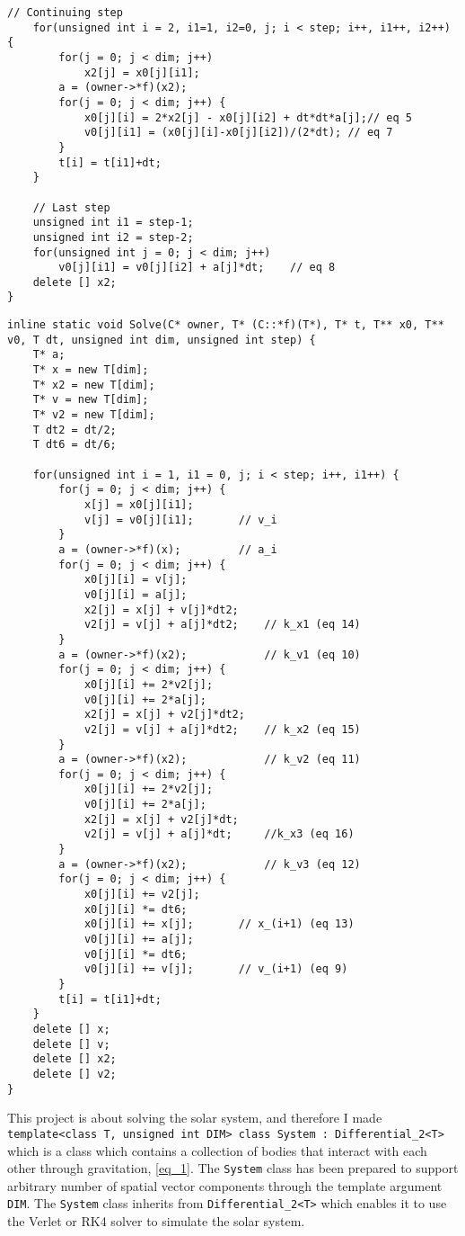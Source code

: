 \documentclass[11pt,english,a4paper]{article}
\begin{document}
\begin{flushleft}
\begin{lstlisting}[title={\texttt{Differential\_2::Diff<DifferentialType::Verlet,C>::Solve}}]
	// Continuing step
	for(unsigned int i = 2, i1=1, i2=0, j; i < step; i++, i1++, i2++) {
		for(j = 0; j < dim; j++)
			x2[j] = x0[j][i1];
		a = (owner->*f)(x2);
		for(j = 0; j < dim; j++) {
			x0[j][i] = 2*x2[j] - x0[j][i2] + dt*dt*a[j];// eq 5
			v0[j][i1] = (x0[j][i]-x0[j][i2])/(2*dt); // eq 7
		}
		t[i] = t[i1]+dt;
	}
	
	// Last step
	unsigned int i1 = step-1;
	unsigned int i2 = step-2;
	for(unsigned int j = 0; j < dim; j++)
		v0[j][i1] = v0[j][i2] + a[j]*dt;	// eq 8
	delete [] x2;
}
\end{lstlisting}

\begin{lstlisting}[title={\texttt{Differential\_2::Diff<DifferentialType::RK4,C>::Solve}}]
inline static void Solve(C* owner, T* (C::*f)(T*), T* t, T** x0, T** v0, T dt, unsigned int dim, unsigned int step) {
	T* a;
	T* x = new T[dim];
	T* x2 = new T[dim];
	T* v = new T[dim];
	T* v2 = new T[dim];
	T dt2 = dt/2;
	T dt6 = dt/6;
	
	for(unsigned int i = 1, i1 = 0, j; i < step; i++, i1++) {
		for(j = 0; j < dim; j++) {
			x[j] = x0[j][i1];
			v[j] = v0[j][i1];		// v_i
		}
		a = (owner->*f)(x);			// a_i
		for(j = 0; j < dim; j++) {
			x0[j][i] = v[j];
			v0[j][i] = a[j];
			x2[j] = x[j] + v[j]*dt2;	
			v2[j] = v[j] + a[j]*dt2;	// k_x1 (eq 14)
		}
		a = (owner->*f)(x2);			// k_v1 (eq 10)
		for(j = 0; j < dim; j++) {
			x0[j][i] += 2*v2[j];
			v0[j][i] += 2*a[j];
			x2[j] = x[j] + v2[j]*dt2;
			v2[j] = v[j] + a[j]*dt2;	// k_x2 (eq 15)
		}
		a = (owner->*f)(x2);			// k_v2 (eq 11)
		for(j = 0; j < dim; j++) {
			x0[j][i] += 2*v2[j];
			v0[j][i] += 2*a[j];
			x2[j] = x[j] + v2[j]*dt;
			v2[j] = v[j] + a[j]*dt;		//k_x3 (eq 16)
		}
		a = (owner->*f)(x2);			// k_v3 (eq 12)
		for(j = 0; j < dim; j++) {
			x0[j][i] += v2[j];
			x0[j][i] *= dt6;
			x0[j][i] += x[j];		// x_(i+1) (eq 13)
			v0[j][i] += a[j];
			v0[j][i] *= dt6;
			v0[j][i] += v[j]; 		// v_(i+1) (eq 9)
		}
		t[i] = t[i1]+dt;
	}
	delete [] x;
	delete [] v;
	delete [] x2;
	delete [] v2;
}
\end{lstlisting}

This project is about solving the solar system, and therefore I made \texttt{template<class T, unsigned int DIM> class System : Differential\_2<T>} which is a class which contains a collection of bodies that interact with each other through gravitation, \eqref{eq_1}. The \texttt{System} class has been prepared to support arbitrary number of spatial vector components through the template argument \texttt{DIM}. The \texttt{System} class inherits from \texttt{Differential\_2<T>} which enables it to use the Verlet or RK4 solver to simulate the solar system.


\end{flushleft}
\end{document}
